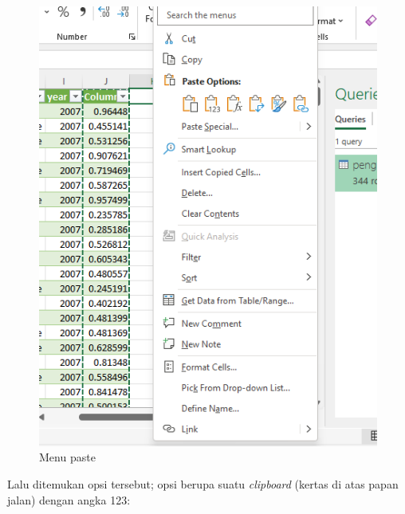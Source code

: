 \documentclass[
  letterpaper,
  DIV=11,
  numbers=noendperiod]{scrreprt}
\begin{document}
\begin{figure}

{\centering \includegraphics{./step1-paste1.png}

}

\caption{Menu paste}

\end{figure}

Lalu ditemukan opsi tersebut; opsi berupa suatu \emph{clipboard} (kertas
di atas papan jalan) dengan angka 123:
\end{document}
